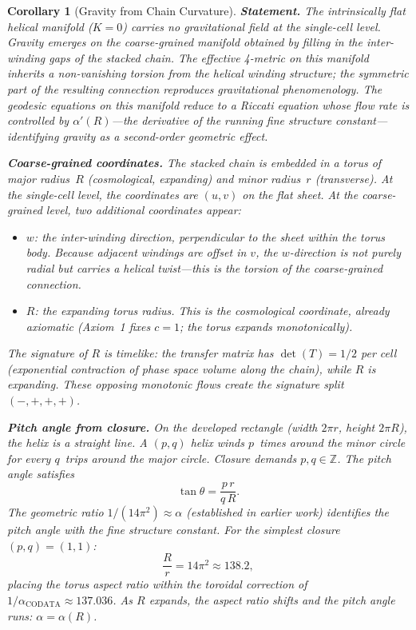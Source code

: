 \documentclass[12pt]{amsart}
\newtheorem{corollary}{Corollary}
\begin{document}
\begin{corollary}[Gravity from Chain Curvature]

\textbf{Statement.}  The intrinsically flat helical manifold ($K=0$) carries no gravitational
field at the single-cell level.  Gravity emerges on the \emph{coarse-grained} manifold
obtained by filling in the inter-winding gaps of the stacked chain.  The effective
4-metric on this manifold inherits a non-vanishing torsion from the helical winding
structure; the symmetric part of the resulting connection reproduces gravitational
phenomenology.  The geodesic equations on this manifold reduce to a Riccati equation
whose flow rate is controlled by $\alpha'(R)$---the derivative of the running fine
structure constant---identifying gravity as a second-order geometric effect.

\medskip
\textbf{Coarse-grained coordinates.}  The stacked chain is embedded in a torus of major
radius~$R$ (cosmological, expanding) and minor radius~$r$ (transverse).  At the
single-cell level, the coordinates are $(u,v)$ on the flat sheet.  At the coarse-grained
level, two additional coordinates appear:
\begin{itemize}
\item $w$: the inter-winding direction, perpendicular to the sheet within the torus body.
      Because adjacent windings are offset in $v$, the $w$-direction is not purely radial
      but carries a helical twist---this is the torsion of the coarse-grained connection.
\item $R$: the expanding torus radius.  This is the cosmological coordinate, already
      axiomatic (Axiom~1 fixes $c=1$; the torus expands monotonically).
\end{itemize}
The signature of $R$ is timelike: the transfer matrix has $\det(T) = 1/2$ per cell
(exponential contraction of phase space volume along the chain), while $R$ is expanding.
These opposing monotonic flows create the signature split $(-,+,+,+)$.

\medskip
\textbf{Pitch angle from closure.}  On the developed rectangle (width $2\pi r$, height
$2\pi R$), the helix is a straight line.  A $(p,q)$ helix winds $p$~times around the
minor circle for every $q$~trips around the major circle.  Closure demands
$p, q \in \mathbb{Z}$.  The pitch angle satisfies
\[
  \tan\theta = \frac{p\, r}{q\, R}.
\]
The geometric ratio $1/(14\pi^2) \approx \alpha$ (established in earlier work) identifies
the pitch angle with the fine structure constant.  For the simplest closure $(p,q)=(1,1)$:
\[
  \frac{R}{r} = 14\pi^2 \approx 138.2,
\]
placing the torus aspect ratio within the toroidal correction of $1/\alpha_{\mathrm{CODATA}}
\approx 137.036$.  As $R$ expands, the aspect ratio shifts and the pitch angle runs:
$\alpha = \alpha(R)$.


\end{corollary}
\end{document}
